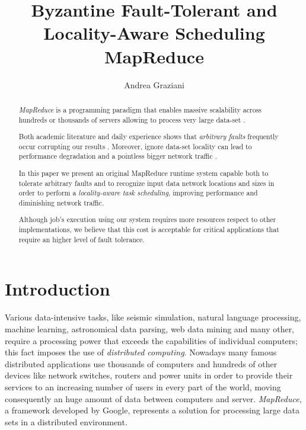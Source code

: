 \documentclass[sigchi]{acmart}
\begin{document}
\title{Byzantine Fault-Tolerant and Locality-Aware Scheduling MapReduce}

\author{Andrea Graziani}

\renewcommand{\shortauthors}{Andrea Graziani (0273395)}

\begin{abstract}
\textit{MapReduce} is a programming paradigm that enables massive scalability across hundreds or thousands of servers allowing to process very large data-set \cite{IBMWhatIsMapReduce}.

Both academic literature and daily experience shows that \textit{arbitrary faults} frequently occur corrupting our results \cite{BFLMapReduce}. Moreover, ignore data-set locality can lead to performance degradation and a pointless bigger network traffic \cite{LARTS}.

In this paper we present an original MapReduce runtime system capable both to tolerate arbitrary faults and to recognize input data network locations and sizes in order to perform a \textit{locality-aware task scheduling}, improving performance and diminishing network traffic.

Although job's execution using our system requires more resources respect to other implementations, we believe that this cost is acceptable for critical applications that require an higher level of fault tolerance.
\end{abstract}

\maketitle

\section{Introduction}

Various data-intensive tasks, like seismic simulation, natural language processing, machine learning, astronomical data parsing, web data mining and many other, require a processing power that exceeds the capabilities of individual computers; this fact imposes the use of \textit{distributed computing}. Nowadays many famous distributed applications use thousands of computers and hundreds of other devices like network switches, routers and power units in order to provide their services to an increasing number of users in every part of the world, moving consequently an huge amount of data between computers and server. \textit{MapReduce}, a framework developed by Google, represents a solution for processing large data sets in a distributed environment. 
\end{document}
